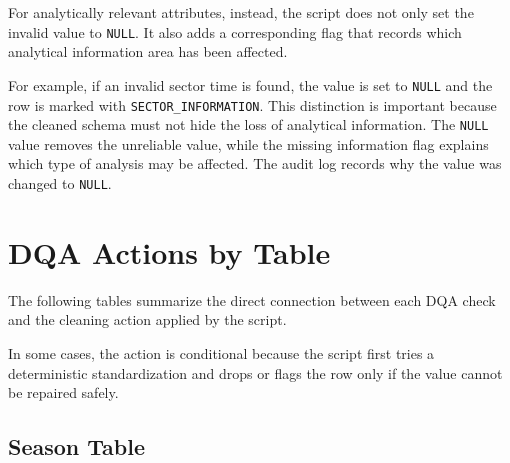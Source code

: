 \documentclass[a4paper,11pt]{article}
\begin{document}
	For analytically relevant attributes, instead, the script does not only set the
	invalid value to \texttt{NULL}. It also adds a corresponding flag that records
	which analytical information area has been affected.
	
	For example, if an invalid sector time is found, the value is set to
	\texttt{NULL} and the row is marked with \texttt{SECTOR\_INFORMATION}.
	This distinction is important because the cleaned schema must not hide the loss
	of analytical information. The \texttt{NULL} value removes the unreliable value,
	while the missing information flag explains which type of analysis may be affected.
	The audit log records why the value was changed to \texttt{NULL}.
	
	
	
	\section{DQA Actions by Table}
	
	The following tables summarize the direct connection between each DQA check and the cleaning action applied by the script.
	

	In some cases, the action is conditional because the script first tries a deterministic standardization and drops or flags the row only if the value cannot be repaired safely.
	
	\subsection{Season Table}
	
\end{document}

